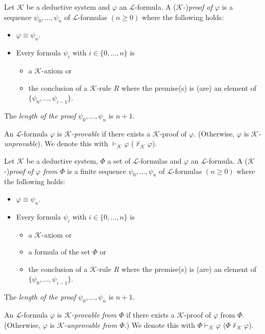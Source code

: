 Let $\mathcal{K}$ be a deductive system and $\varphi$ an $\mathcal{L}$-formula. A ($\mathcal{K}$-)\textit{proof of $\varphi$} is a sequence $\psi_0, \ldots, \psi_n$ of $\mathcal{L}$-formulas $(n \ge 0)$ where the following holds:
\begin{itemize}
\item $\varphi \equiv \psi_n$.
\item Every formula $\psi_i$ with $i \in \lbrace 0, \ldots, n \rbrace$ is 
\begin{itemize}
\item a $\mathcal{K}$-axiom or
\item the conclusion of a $\mathcal{K}$-rule $R$ where the premise(s) is (are) an element of $\lbrace \psi_0,\ldots, \psi_{i-1} \rbrace$.
\end{itemize}
\end{itemize}

The \textit{length of the proof} $\psi_0, \ldots, \psi_n$ is $n+1$.

An $\mathcal{L}$-formula $\varphi$ is \textit{$\mathcal{K}$-provable} if there exists a $\mathcal{K}$-proof of $\varphi$. (Otherwise, $\varphi$ is \textit{$\mathcal{K}$-unprovable}). We denote this with $\vdash_\mathcal{K} \varphi$ ($\nvdash_\mathcal{K} \varphi$). 

Let $\mathcal{K}$ be a deductive system, $\Phi$ a set of $\mathcal{L}$-formulas and $\varphi$ an $\mathcal{L}$-formula. A ($\mathcal{K}$-)\textit{proof of $\varphi$ from $\Phi$} is a finite sequence $\psi_0, \ldots, \psi_n$ of $\mathcal{L}$-formulas $(n \ge 0)$ where the following holds:
\begin{itemize}
\item $\varphi \equiv \psi_n$.
\item Every formula $\psi_i$ with $i \in \lbrace 0, \ldots, n \rbrace$ is 
\begin{itemize}
\item a $\mathcal{K}$-axiom or
\item a formula of the set $\Phi$ or
\item the conclusion of a $\mathcal{K}$-rule $R$ where the premise(s) is (are) an element of $\lbrace \psi_0,\ldots, \psi_{i-1} \rbrace$.
\end{itemize}
\end{itemize}

The \textit{length of the proof} $\psi_0, \ldots, \psi_n$ is $n+1$.

An $\mathcal{L}$-formula $\varphi$ is \textit{$\mathcal{K}$-provable from $\Phi$} if there exists a $\mathcal{K}$-proof of $\varphi$ from $\Phi$. (Otherwise, $\varphi$ is \textit{$\mathcal{K}$-unprovable from $\Phi$}.) We denote this with $\Phi \vdash_\mathcal{K} \varphi$ ($\Phi \nvdash_\mathcal{K} \varphi$).

